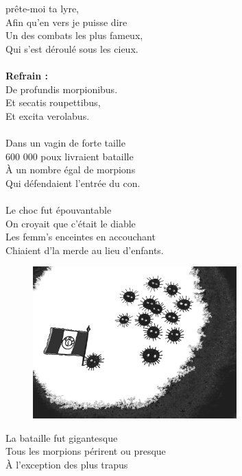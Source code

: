 \vspace{-0.7cm}
 prête-moi ta lyre,
\\Afin qu'en vers je puisse dire
\\Un des combats les plus fameux,
\\Qui s'est déroulé sous les cieux.
\\\\\textbf{Refrain :}
\\De profundis morpionibus.
\\Et secatis roupettibus,
\\Et excita verolabus.
\\\\Dans un vagin de forte taille
\\600 000 poux livraient bataille
\\À un nombre égal de morpions
\\Qui défendaient l'entrée du con.
\\\\Le choc fut épouvantable
\\On croyait que c'était le diable
\\Les femm's enceintes en accouchant
\\Chiaient d'la merde au lieu d'enfants.
\bigskip
\begin{figure}[h!]
\centering
   \includegraphics[width=0.7\textwidth]{images/de_profundis_morpionibus.jpg}
 \end{figure}
\breakpage
La bataille fut gigantesque
\\Tous les morpions périrent ou presque
\\À l'exception des plus trapus

